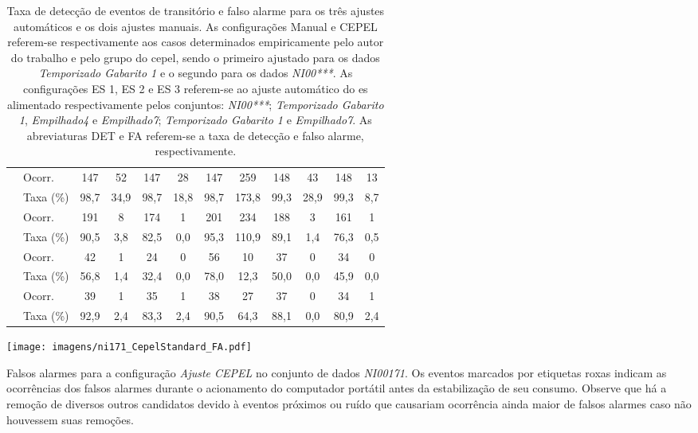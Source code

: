 \begin{table}[ht!]
{\begin{tabular}{>{\centering}m{3cm}>{\centering}m{1.3cm}cccccccccc}
{\footnotesize{(149~eventos)}} & \scriptsize{Ocorr.} &
147 & 52  &
147 & 28  &
147 & 259 &
148 & 43  &
148 & 13  \\
 & \scriptsize{Taxa (\%)} &
98,7 & 34,9  &
98,7 & 18,8  &
98,7 & 173,8 &
99,3 & 28,9  &
99,3 & 8,7 \\ \hline
\multirow{2}{3cm}{\centering\emph{Temp. Gab. 2}
\footnotesize{(211~eventos)}} & \scriptsize{Ocorr.} &
191 &  8  &
174 &  1  &
201 & 234 &
188 &  3  &
161 &  1 \\
 & \scriptsize{Taxa (\%)} &
90,5 & 3,8   &
82,5 & 0,0   &
95,3 & 110,9 &
89,1 & 1,4   &
76,3 & 0,5 \\ \hline
\multirow{2}{3cm}{\centering\emph{Empilhado4}
\footnotesize{(74~eventos)}} & \scriptsize{Ocorr.} &
42 & 1 &
24 & 0 &
56 & 10 &
37 & 0 &
34 & 0 \\
 & \scriptsize{Taxa (\%)} &
56,8 & 1,4  &
32,4 & 0,0  &
78,0 & 12,3 &
50,0 & 0,0  &
45,9 & 0,0 \\ \hline
\multirow{2}{3cm}{\centering\emph{Empilhado7}
\footnotesize{(42~eventos)}} & \scriptsize{Ocorr.} &
39 & 1  &
35 & 1  &
38 & 27 &
37 & 0  &
34 & 1 \\
 & \scriptsize{Taxa (\%)} &
92,9 & 2,4  &
83,3 & 2,4  &
90,5 & 64,3 &
88,1 & 0,0  &
80,9 & 2,4 \\
\hline \hline
\end{tabular}}
\caption[Taxa de detecção de eventos de transitório e falso
alarme para os três ajustes automáticos e os dois ajustes manuais.]{
Taxa de detecção de eventos de transitório e falso alarme
para os três ajustes automáticos e os dois ajustes manuais.  As
configurações Manual e CEPEL referem-se respectivamente aos casos
determinados empiricamente pelo autor do trabalho e pelo grupo do
\gls{cepel}, sendo o primeiro ajustado para os dados
\emph{Temporizado Gabarito 1} e
o segundo para os dados \emph{NI00***}. As configurações ES 1, ES 2 e ES
3 referem-se ao ajuste automático do \acs{es} alimentado
respectivamente pelos conjuntos: \emph{NI00***}; \emph{Temporizado
Gabarito 1}, \emph{Empilhado4} e \emph{Empilhado7}; \emph{Temporizado
Gabarito 1} e \emph{Empilhado7}. As abreviaturas DET e FA referem-se a
taxa de detecção e falso alarme, respectivamente.}
\label{tab:resultados}
\end{table}

\begin{SidewaysFigure}
\centering
\texttt{[image: imagens/ni171\_CepelStandard\_FA.pdf]}
\caption[Falsos alarmes para a configuração \emph{Ajuste CEPEL} no
conjunto de dados \emph{NI00171}.]
{Falsos alarmes para a configuração \emph{Ajuste CEPEL} no
conjunto de dados \emph{NI00171}. Os eventos marcados por etiquetas
roxas indicam as ocorrências dos falsos alarmes durante o acionamento
do computador portátil antes da estabilização de seu consumo. Observe
que há a remoção de diversos outros candidatos devido à eventos
próximos ou ruído que causariam ocorrência ainda maior de falsos
alarmes caso não houvessem suas remoções.}
\label{fig:ni171_cepel}
\end{SidewaysFigure}

